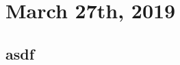 \documentclass[../main/main.tex]{subfiles}
\begin{document}
\section{March 27th, 2019}
\subsection{asdf}
\end{document}

